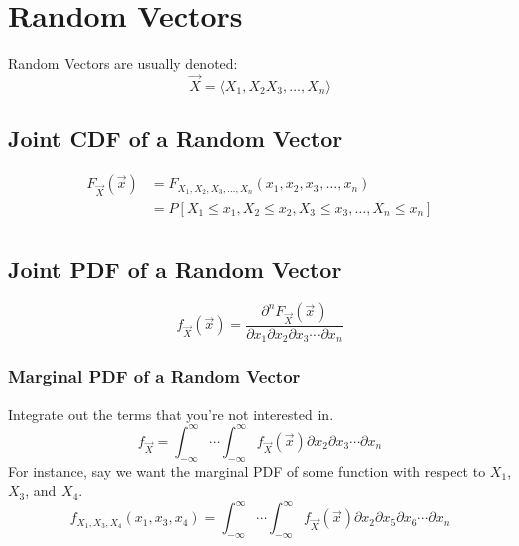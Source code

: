 \section{Random Vectors} \label{sec:Random Vectors}
Random Vectors are usually denoted:
	\begin{equation} \label{eq:Random Vector Notation}
		\vec{X} = \langle X_{1}, X_{2} X_{3}, \ldots, X_{n} \rangle
	\end{equation}
	
	\subsection{Joint CDF of a Random Vector} \label{subsec:Joint CDF of Random Vector}
		\begin{equation} \label{eq:Joint CDF of Random Vector}
			\begin{aligned}
				F_{\vec{X}} \left( \vec{x} \right) 
					&= F_{X_{1}, X_{2}, X_{3}, \ldots, X_{n}} \left( x_{1}, x_{2}, x_{3}, \ldots, x_{n} \right) \\
					&= P \left[ X_{1} \leq x_{1}, X_{2} \leq x_{2}, X_{3} \leq x_{3}, \ldots, X_{n} \leq x_{n} \right] \\
			\end{aligned}
		\end{equation}
		
	\subsection{Joint PDF of a Random Vector} \label{subsec:Joint PDF of Random Vector}
		\begin{equation} \label{eq:Joint PDF of Random Vector}
			f_{\vec{X}} \left( \vec{x} \right) = \frac{\partial^{n} F_{\vec{X}} \left( \vec{x} \right)}{\partial x_{1} \partial x_{2} \partial x_{3} \cdots \partial x_{n}}
		\end{equation}
		
		\subsubsection{Marginal PDF of a Random Vector} \label{subsubsec:Marginal PDF of Random Vector}
		Integrate out the terms that you're not interested in.
		\begin{equation} \label{eq:Marginal PDF of Random Vector}
			f_{\vec{X}} = \int_{-\infty}^{\infty} \cdots \int_{-\infty}^{\infty} f_{\vec{X}} \left( \vec{x} \right) \partial x_{2} \partial x_{3} \cdots \partial x_{n}
		\end{equation}
		For instance, say we want the marginal PDF of some function with respect to $X_{1}$, $X_{3}$, and $X_{4}$.
		\begin{equation} \label{eq:Marginal PDF of Random Vector Multiple Variables}
			f_{X_{1}, X_{3}, X_{4}} \left( x_{1}, x_{3}, x_{4} \right) = \int_{-\infty}^{\infty} \cdots \int_{-\infty}^{\infty} f_{\vec{X}} \left( \vec{x} \right) \partial x_{2} \partial x_{5} \partial x_{6} \cdots \partial x_{n}
		\end{equation}
	
